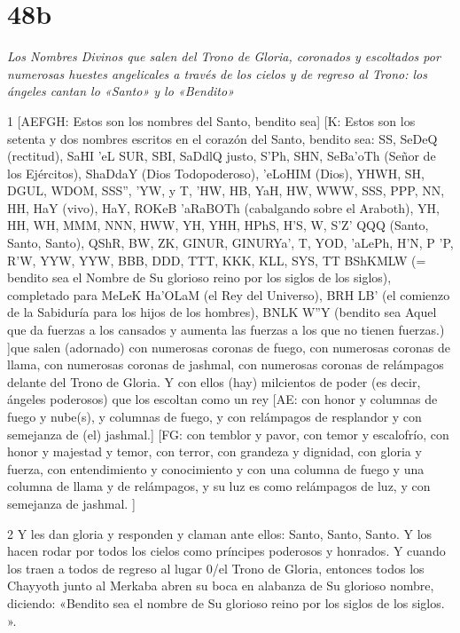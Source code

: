 \chapter{48b}

\par \textit{Los Nombres Divinos que salen del Trono de Gloria, coronados y escoltados por numerosas huestes angelicales a través de los cielos y de regreso al Trono: los ángeles cantan lo «Santo» y lo «Bendito»}

\par 1 [AEFGH: Estos son los nombres del Santo, bendito sea] [K: Estos son los setenta y dos nombres escritos en el corazón del Santo, bendito sea: SS, SeDeQ (rectitud), SaHI 'eL SUR, SBI, SaDdlQ {justo}, S'Ph, SHN, SeBa'oTh (Señor de los Ejércitos), ShaDdaY (Dios Todopoderoso), 'eLoHIM (Dios), YHWH, SH, DGUL, WDOM, SSS'', 'YW, y T, 'HW, HB, YaH, HW, WWW, SSS, PPP, NN, HH, HaY (vivo), HaY, ROKeB 'aRaBOTh (cabalgando sobre el Araboth), YH, HH, WH, MMM, NNN, HWW, YH, YHH, HPhS, H'S, W, S'Z' QQQ (Santo, Santo, Santo), QShR, BW, ZK, GINUR, GINURYa', T, YOD, 'aLePh, H'N, P 'P, R'W, YYW, YYW, BBB, DDD, TTT, KKK, KLL, SYS, TT BShKMLW (= bendito sea el Nombre de Su glorioso reino por los siglos de los siglos), completado para MeLeK Ha'OLaM (el Rey del Universo), BRH LB' (el comienzo de la Sabiduría para los hijos de los hombres), BNLK W''Y (bendito sea Aquel que da fuerzas a los cansados ​​y aumenta las fuerzas a los que no tienen fuerzas.) ]que salen (adornado) con numerosas coronas de fuego, con numerosas coronas de llama, con numerosas coronas de jashmal, con numerosas coronas de relámpagos delante del Trono de Gloria. Y con ellos (hay) milcientos de poder (es decir, ángeles poderosos) que los escoltan como un rey [AE: con honor y columnas de fuego y nube(s), y columnas de fuego, y con relámpagos de resplandor y con semejanza de (el) jashmal.] [FG: con temblor y pavor, con temor y escalofrío, con honor y majestad y temor, con terror, con grandeza y dignidad, con gloria y fuerza, con entendimiento y conocimiento y con una columna de fuego y una columna de llama y de relámpagos, y su luz es como relámpagos de luz, y con semejanza de jashmal. ]

\par 2 Y les dan gloria y responden y claman ante ellos: Santo, Santo, Santo. Y los hacen rodar por todos los cielos como príncipes poderosos y honrados. Y cuando los traen a todos de regreso al lugar 0/el Trono de Gloria, entonces todos los Chayyoth junto al Merkaba abren su boca en alabanza de Su glorioso nombre, diciendo: «Bendito sea el nombre de Su glorioso reino por los siglos de los siglos. ».



